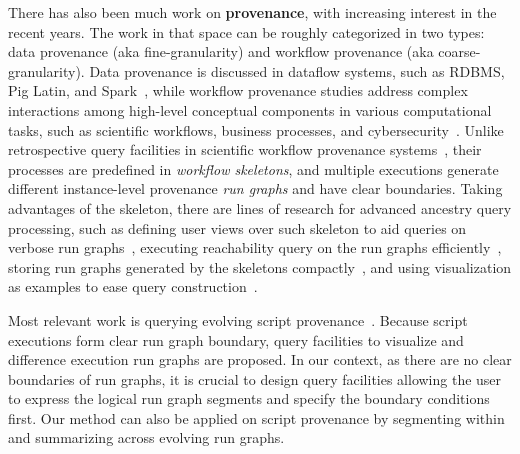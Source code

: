 \documentclass[11pt]{article}
\newcommand{\eat}[1]{}
\begin{document}
There has also been much work on {\bf provenance}, with increasing interest in the recent years. The work in that space can be roughly categorized in two types: data
provenance (aka fine-granularity) and workflow provenance (aka coarse-granularity). Data provenance is discussed in dataflow systems, such as RDBMS, Pig Latin, and
Spark~\cite{survey_chiew@ftdb09,lipstick@pvldb11,titian@pvldb15}, while workflow provenance studies address complex interactions among high-level conceptual components
in various computational tasks, such as scientific workflows, business processes, and
cybersecurity~\cite{freire2008provenance,freire2008provenance,bpql_milo@vldb06,linuxprov_abates@atc15}.  Unlike retrospective query facilities in scientific workflow
provenance systems~\cite{freire2008provenance}, their processes are predefined in \emph{workflow skeletons}, and multiple executions generate different instance-level
provenance \emph{run graphs} and have clear boundaries. Taking advantages of the skeleton\eat{definition}, there are lines of research \eat{to aid}for advanced ancestry
query processing\eat{are important topics of study}, such as defining user views over such skeleton to aid queries on verbose run graphs~\cite{zoom_penn@icde08},
executing reachability query on the run graphs efficiently~\cite{reachability_optimallabeling_upenn@sigmod10}, storing run graphs generated by the skeletons
compactly~\cite{compression_bertram@edbt09}, and using visualization as examples to ease query construction~\cite{visualization@vis05}. 

Most relevant work is querying evolving script provenance~\cite{ingestions_noworkflow@ipaw14,noworkflow_evolution@ipaw16}. Because script executions form clear run graph
boundary, query facilities to visualize and difference execution run graphs are proposed. In our context, as there are no clear boundaries of run graphs, it is crucial
to design query facilities allowing the user to express the logical run graph segments and specify the boundary conditions first. Our method can also be applied on
script provenance by segmenting within and summarizing across evolving run graphs.
\end{document}
